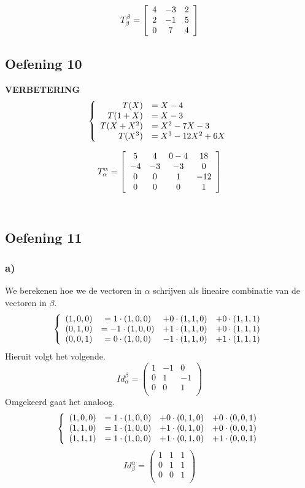 \documentclass[lineaire_algebra_oplossingen.tex]{subfiles}
\begin{document}
\[
T^{\beta}_{\beta} =
\left[
\begin{array}{c c c}
4 & -3 & 2\\
2 & -1 & 5\\
0 & 7 & 4
\end{array}
\right]
\]


\subsection{Oefening 10}
\textbf{VERBETERING}
\[
\left\lbrace
\begin{array}{r l}
T(X) &= X-4\\
T(1+X) &= X-3\\
T(X+X^2) &= X^2-7X-3\\
T(X^3) &= X^3-12X^2+6X\\
\end{array}
\right.
\]

\[
T^{\alpha}_{\alpha} =
\left[
\begin{array}{c c c c}
5 & 4 & 0-4 & 18\\
-4 & -3 & -3 & 0\\
0 & 0 & 1 & -12\\
0 & 0 & 0 & 1
\end{array}
\right]
\]\\

\subsection{Oefening 11}
\subsubsection*{a)}
We berekenen hoe we de vectoren in $\alpha$ schrijven als lineaire combinatie van de vectoren in $\beta$.
\[
\left\lbrace
\begin{array}{c c c c}
(1,0,0) &= 1\cdot (1,0,0) &+ 0\cdot (1,1,0) &+ 0\cdot (1,1,1)\\
(0,1,0) &= -1\cdot(1,0,0) &+ 1\cdot (1,1,0) &+ 0\cdot (1,1,1)\\
(0,0,1) &= 0\cdot(1,0,0) &-1\cdot (1,1,0) &+ 1\cdot (1,1,1)
\end{array}
\right.
\]
Hieruit volgt het volgende.
\[
Id_\alpha^\beta = 
\begin{pmatrix}
1 & -1 & 0\\
0 & 1 & -1\\
0 & 0 & 1\\
\end{pmatrix}
\]
Omgekeerd gaat het analoog.
\[
\left\lbrace
\begin{array}{c c c c}
(1,0,0) &= 1\cdot (1,0,0) &+ 0\cdot (0,1,0) &+ 0\cdot (0,0,1)\\
(1,1,0) &= 1\cdot (1,0,0) &+ 1\cdot (0,1,0) &+ 0\cdot (0,0,1)\\
(1,1,1) &= 1\cdot (1,0,0) &+ 1\cdot (0,1,0) &+ 1\cdot (0,0,1)
\end{array}
\right.
\]
\[
Id_\beta^\alpha = 
\begin{pmatrix}
1 & 1 & 1\\
0 & 1 & 1\\
0 & 0 & 1\\
\end{pmatrix}
\]
\end{document}
